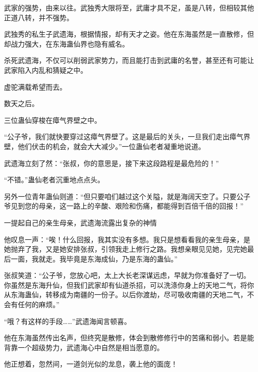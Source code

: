 \begin{this_body}
武家的强势，由来以往。武独秀大限将至，武庸才具不足，虽是八转，但相较其他正道八转，并不强势。

武独秀的私生子武遗海，根据情报，却有天才之姿。他在东海虽然是一直散修，但却战力强大，在东海蛊仙界也隐有威名。

杀死武遗海，不仅可以削弱武家势力，而且能打击到武庸的名誉，甚至还有可能让武家陷入内乱和猜疑之中。

虚驼满载希望而去。

数天之后。

三位蛊仙穿梭在瘴气界壁之中。

“公子爷，我们就快要穿过这瘴气界壁了。这是最后的关头，一旦我们走出瘴气界壁，他们伏击的机会，就会大大减少。”一位蛊仙老者凝重地说道。

武遗海立刻了然：“张叔，你的意思是，接下来这段路程是最危险的！”

“不错。”蛊仙老者沉重地点点头。

另外一位青年蛊仙则道：“但只要咱们越过这个关隘，就是海阔天空了。只要公子爷见到您的母亲，这一路上的辛酸、艰险和伤痛，都能得到百倍千倍的回报！”

一提起自己的亲生母亲，武遗海流露出复杂的神情

他叹息一声：“唉！什么回报，我其实没有多想。我只是想看看我的亲生母亲，是她抛弃了我，又是她安排张叔，引领我走上修行之路。我想亲眼见见她，见完她最后一面，我就走。我毕竟是东海成仙，乃是东海的蛊仙。”

张叔笑道：“公子爷，您放心吧，太上大长老深谋远虑，早就为你准备好了一切。你虽然是东海升仙，但我们武家却有仙道杀招，可以洗涤你身上的天地二气，将你从东海蛊仙，转移成为南疆的一份子。以后你渡劫，尽可吸收南疆的天地二气，不会有任何的麻烦。”

“哦？有这样的手段……”武遗海闻言顿喜。

他在东海虽然传出名声，但终究是散修，体会到散修修行中的苦痛和弱小。若是能背靠一个超级势力，武遗海心中自然是相当愿意的。

他正想着，忽然间，一道剑光似的龙息，袭上他的面庞！

\end{this_body}

